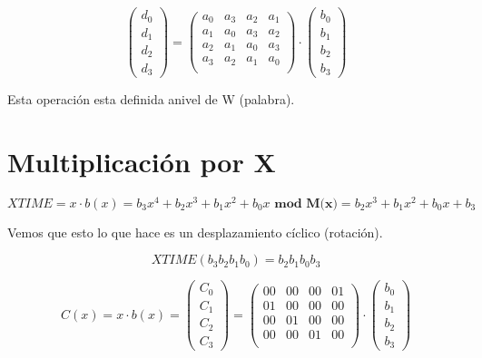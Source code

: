  $$\left(\begin{matrix}
 d_0\\d_1\\d_2\\d_3
 \end{matrix} \right) = \left(\begin{matrix}
 a_0 & a_3 & a_2 & a_1\\
 a_1 & a_0 & a_3 & a_2\\
 a_2 & a_1 & a_0 & a_3\\
 a_3 & a_2 & a_1 & a_0\\
 \end{matrix}\right) \cdot \left( \begin{matrix}
 b_0\\
 b_1\\
 b_2\\
 b_3
 \end{matrix}\right)$$
 
 Esta operación esta definida  anivel de W (palabra).
 
 \section{Multiplicación por X}
 
 $$XTIME = x \cdot b(x) = b_3x^4 + b_2 x^3 + b_1 x^2 + b_0 x \textbf{ mod M(x)} = b_2x^3 +b_1x^2 + b_0x + b_3$$
 
 Vemos que esto lo que hace es un desplazamiento cíclico (rotación).
 
 $$XTIME(b_3 b_2 b_1 b_0) = b_2 b_1 b_0 b_3$$
 
 
 $$C(x) = x \cdot b(x) = \left(\begin{matrix}
 	C_0\\C_1\\C_2\\C_3
 \end{matrix} \right) = \left(\begin{matrix}
 00 & 00 & 00 & 01\\
 01 & 00 & 00 & 00\\
 00 & 01 & 00 & 00\\
 00 & 00 & 01 & 00\\
\end{matrix}\right) \cdot \left( \begin{matrix}
b_0\\
b_1\\
b_2\\
b_3
\end{matrix}\right)$$
 
